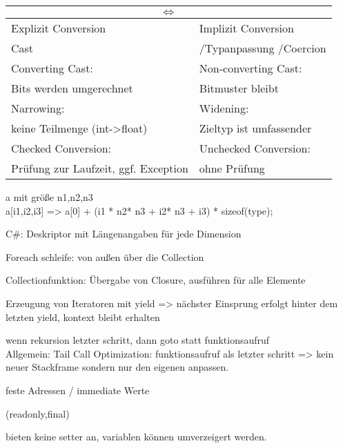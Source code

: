 \begin{tabular}{|l|l|}
\hline
\multicolumn{2}{|c|}{$\Leftrightarrow$}\\
\hline
Explizit Conversion  & Implizit Conversion \\
Cast &/Typanpassung /Coercion  \\
\hline
Converting Cast:  & Non-converting Cast: \\
Bits werden umgerechnet & Bitmuster bleibt \\
\hline
Narrowing:  & Widening:  \\
keine Teilmenge (int->float)&Zieltyp ist umfassender\\
\hline
Checked Conversion:   &Unchecked Conversion:  \\
Prüfung zur Laufzeit, ggf. Exception &ohne Prüfung\\
\hline
\end{tabular}

%


 a mit größe n1,n2,n3 \\
a[i1,i2,i3] =>  a[0] + (i1 * n2* n3 + i2* n3 + i3) * sizeof(type);

C\#: Deskriptor mit Längenangaben für jede Dimension

Foreach schleife: von außen über die Collection

 Collectionfunktion: Übergabe von Closure, ausführen für alle Elemente

Erzeugung von Iteratoren mit yield => nächster Einsprung erfolgt hinter dem letzten yield, kontext bleibt erhalten

 wenn rekursion letzter schritt, dann goto statt funktionsaufruf\\
Allgemein: Tail Call Optimization: funktionsaufruf als letzter schritt => kein neuer Stackframe sondern nur den eigenen anpassen.



 feste Adressen / immediate Werte

 (readonly,final)

 bieten keine setter an, variablen können umverzeigert werden.

